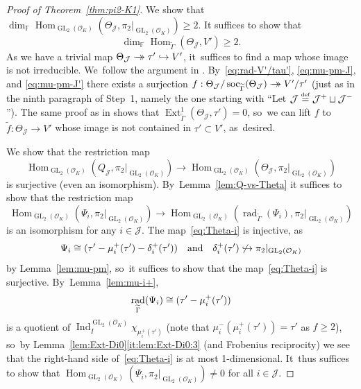 \documentclass[JEP,XML,SOM,Unicode,NoFloatCountersInSection, NoEqCountersInSection,published]{cedram}
\newcommand\hto{\mathrel{\lhook\joinrel\to}}
\newcommand{\onto}{\mathchoice{\to\hspace*{-5mm}\to}{\mathrel{\hbox{$\to\hspace*{-2.85mm}\to$}}}{\to\hspace*{-3mm}\to}{\to\hspace*{-3mm}\to}}
\newcommand{\quand}{\quad\text{and}\quad}
\let\wt\widetilde
\newcommand{\defeq}{\stackrel{\textrm{\tiny{\upshape{def}}}}{=}}
\newcommand{\F}{\mathbb{F}}
\newcommand{\cJ}{{\mathcal{J}}}
\newcommand{\cO}{\mathcal{O}}
\DeclareMathOperator{\Ext}{Ext}
\DeclareMathOperator{\GL}{GL}
\DeclareMathOperator{\Hom}{Hom}
\DeclareMathOperator{\Ind}{Ind}
\DeclareMathOperator{\rad}{rad}
\DeclareMathOperator{\soc}{soc}
\theoremstyle{plain}
\theoremstyle{definition}
\begin{document}
\begin{proof}[Proof of Theorem~\ref{thm:pi2-K1}]
We show that $\dim_\F \Hom_{\GL_2(\cO_K)}(\Theta_{\cJ},\pi_2|_{\GL_2(\cO_K)}) \ge 2$.
It suffices to show that
\[
\dim_\F \Hom_{\wt\Gamma}(\Theta_{\cJ},V') \geq 2.
\]
As we have a trivial map $\Theta_{\cJ} \onto \tau' \hto V'$, it~suffices to find a map whose image is not irreducible. We~follow the argument in \cite[Cor.\,3.14]{HuWang2}.
By~\eqref{eq:rad-V'/tau'}, \eqref{eq:mu-pm-J}, and \eqref{eq:mu-pm-J'} there exists a surjection $f: \Theta_{\cJ}/\soc_{\wt\Gamma}(\Theta_{\cJ}) \onto V'/\tau'$ (just as in the ninth paragraph of Step~1, namely the one starting with ``Let $\cJ \defeq \cJ^+ \sqcup \cJ^-$'').
The same proof as in \cite[Cor.\,3.13]{HuWang2} shows that $\Ext^1_{\wt\Gamma}(\Theta_{\cJ},\tau') = 0$, so~we can lift $f$ to $\wt f: \Theta_{\cJ} \to V'$ whose image is not contained in $\tau' \subset V'$, as~desired.

We show that the restriction map
\begin{equation}\label{eq:Q-Theta}
\Hom_{\GL_2(\cO_K)}(Q_{\cJ},\pi_2|_{\GL_2(\cO_K)}) \to \Hom_{\GL_2(\cO_K)}(\Theta_{\cJ},\pi_2|_{\GL_2(\cO_K)})
\end{equation}
is surjective (even an isomorphism). By~Lemma~\ref{lem:Q-vs-Theta} it suffices to show that the restriction map
\begin{equation}\label{eq:Theta-i}
\Hom_{\GL_2(\cO_K)}(\Psi_i,\pi_2|_{\GL_2(\cO_K)}) \to \Hom_{\GL_2(\cO_K)}(\rad_{\wt\Gamma}(\Psi_i),\pi_2|_{\GL_2(\cO_K)})
\end{equation}
is an isomorphism for any $i \in \cJ$.
The map~\eqref{eq:Theta-i} is injective, as
\[
\Psi_i \cong (\tau' \-- \mu_i^+(\tau') \-- \delta_i^+(\tau'))\quand\delta_i^+(\tau') \not\hto \pi_2|_{\GL_2(\cO_K)}
\]
by Lemma~\ref{lem:mu-pm}, so~it suffices to show that the map~\eqref{eq:Theta-i} is surjective. By~Lemma~\ref{lem:mu-i+},
\[
\rad_{\wt\Gamma}(\Psi_i) \cong (\tau' \-- \mu_i^+(\tau'))
\]
is a quotient of $\Ind_I^{\GL_2(\cO_K)} \chi_{\mu_i^+(\tau')}$ (note that $\mu_i^-(\mu_i^+(\tau')) = \tau'$ as $f\geq 2$), so~by Lemma~\ref{lem:Ext-Di0}\eqref{it:lem:Ext-Di0:3} (and Frobenius reciprocity) we see that the right-hand side of~\eqref{eq:Theta-i} is at most 1-dimensional. It~thus suffices to show that $\Hom_{\GL_2(\cO_K)}(\Psi_i,\pi_2|_{\GL_2(\cO_K)}) \ne 0$ for all $i \in \cJ$.


\end{proof}
\end{document}
